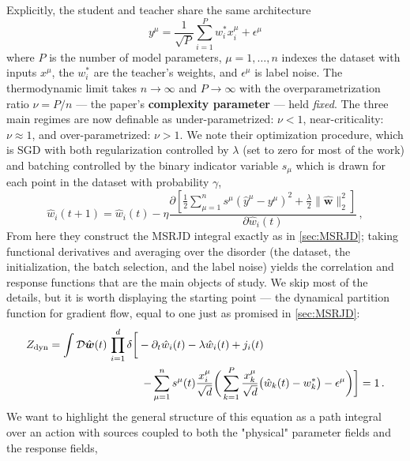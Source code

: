 \documentclass[11pt]{article}
\begin{document}
Explicitly, the student and teacher share the same architecture 
\begin{equation}
    y^\mu=\frac{1}{\sqrt{P}} \sum_{i=1}^P w^*_i x_i^\mu+\epsilon^\mu
\end{equation}
where $P$ is the number of model parameters, $\mu=1, \ldots, n$ indexes the dataset with inputs $x^\mu$, the $w^*_i$ are the teacher's weights, and $\epsilon^\mu$ is label noise.
The thermodynamic limit takes $n \to \infty$ and $P \to \infty$ with the overparametrization ratio $\nu = P/n$ --- the paper's \textbf{complexity parameter} --- held \textit{fixed}. The three main regimes are now definable as under-parametrized: $\nu<1$, near-criticality: $\nu \approx 1$, and over-parametrized: $\nu>1$. We note their optimization procedure, which is SGD with both regularization controlled by $\lambda$ (set to zero for most of the work) and batching controlled by the binary indicator variable $s_\mu$ which is drawn for each point in the dataset with probability $\gamma$,
\begin{equation}
{\hat{w}_i(t+1)=\hat{w}_i(t)-{\eta} \frac{\partial\left[ \frac{1}{2} \sum_{\mu=1}^n s^{\mu}\left(\hat{y}^\mu-y^\mu\right)^2+\frac{\lambda}{2}\|\hat{\boldsymbol{w}}\|_2^2\right]}{\partial \hat{w}_i(t)}}\,,
\label{eq2}
\end{equation}
From here they construct the MSRJD integral exactly as in \cref{sec:MSRJD}; taking functional derivatives and averaging over the disorder (the dataset, the initialization, the batch selection, and the label noise) yields the correlation and response functions that are the main objects of study. We skip most of the details, but it is worth displaying the starting point --- the dynamical partition function for gradient flow, equal to one just as promised in \cref{sec:MSRJD}:
\begin{equation}
\begin{aligned}
Z_{\mathrm{dyn}} = \int \mathcal{D} \hat{\boldsymbol{w}}(t)\, \prod_{i=1}^d \delta\bigg[-\partial_t{\hat{w}}_i(t) - \lambda \hat{w}_i(t)+j_i(t) \hspace{1.2in} & \\ - \sum_{\mu=1}^n s^\mu(t) \frac{x_i^\mu}{\sqrt{d}} \bigg( \sum_{k=1}^P \frac{x_k^\mu}{\sqrt{d}} \big( \hat{w}_k(t) - w^*_k \big) - \epsilon^\mu \bigg) \bigg] &= 1\,.
\end{aligned}
\label{partition}
\end{equation}
We want to highlight the general structure of this equation as a path integral over an action with sources coupled to both the "physical" parameter fields and the response fields, 
\end{document}
